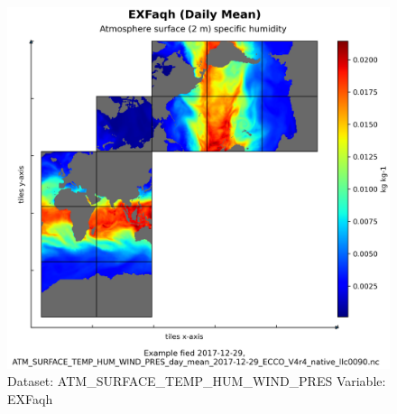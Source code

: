 \begin{figure}[H]
\centering
\includegraphics[width=\textwidth]{../images/plots/native_plots/Atmosphere_Surface_Temperature_Humidity_Wind_and_Pressure/EXFaqh.png}
\caption{Dataset: ATM\_SURFACE\_TEMP\_HUM\_WIND\_PRES Variable: EXFaqh}
\label{tab:table-ATM_SURFACE_TEMP_HUM_WIND_PRES_EXFaqh-Plot}
\end{figure}
\pagebreak

